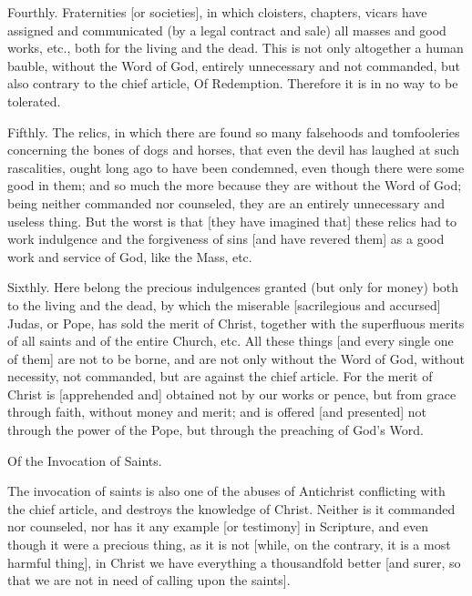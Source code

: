 Fourthly. Fraternities [or societies], in which cloisters,
chapters, vicars have assigned and communicated (by a legal
contract and sale) all masses and good works, etc., both for
the living and the dead. This is not only altogether a human
bauble, without the Word of God, entirely unnecessary and not
commanded, but also contrary to the chief article, Of
Redemption. Therefore it is in no way to be tolerated.

Fifthly. The relics, in which there are found so many
falsehoods and tomfooleries concerning the bones of dogs and
horses, that even the devil has laughed at such rascalities,
ought long ago to have been condemned, even though there were
some good in them; and so much the more because they are
without the Word of God; being neither commanded nor
counseled, they are an entirely unnecessary and useless thing.
But the worst is that [they have imagined that] these relics
had to work indulgence and the forgiveness of sins [and have
revered them] as a good work and service of God, like the
Mass, etc.

Sixthly. Here belong the precious indulgences granted (but
only for money) both to the living and the dead, by which the
miserable [sacrilegious and accursed] Judas, or Pope, has sold
the merit of Christ, together with the superfluous merits of
all saints and of the entire Church, etc. All these things
[and every single one of them] are not to be borne, and are
not only without the Word of God, without necessity, not
commanded, but are against the chief article. For the merit of
Christ is [apprehended and] obtained not by our works or
pence, but from grace through faith, without money and merit;
and is offered [and presented] not through the power of the
Pope, but through the preaching of God's Word.


Of the Invocation of Saints.

The invocation of saints is also one of the abuses of
Antichrist conflicting with the chief article, and destroys
the knowledge of Christ. Neither is it commanded nor
counseled, nor has it any example [or testimony] in Scripture,
and even though it were a precious thing, as it is not [while,
on the contrary, it is a most harmful thing], in Christ we
have everything a thousandfold better [and surer, so that we
are not in need of calling upon the saints].

